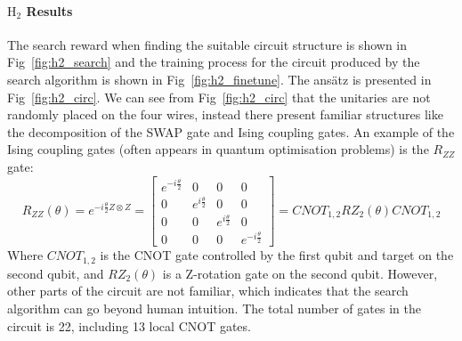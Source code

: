 \documentclass[a4paper,onecolumn,11pt]{quantumarticle}
\begin{document}
\paragraph{$\text{H}_2$ Results} The search reward when finding the suitable circuit structure is shown in Fig~\ref{fig:h2_search} and the training process for the circuit produced by the search algorithm is shown in Fig~\ref{fig:h2_finetune}. The ans\"atz is presented in Fig~\ref{fig:h2_circ}. We can see from Fig~\ref{fig:h2_circ} that the unitaries are not randomly placed on the four wires, instead there present familiar structures like the decomposition of the SWAP gate and Ising coupling gates. An example of the Ising coupling gates (often appears in quantum optimisation problems) is the $R_{ZZ}$ gate:
\begin{equation}
R_{Z Z}(\theta)=e^{ -i \frac{\theta}{2} Z \otimes Z}=\left[\begin{array}{cccc}
e^{-i \frac{\theta}{2}} & 0 & 0 & 0 \\
0 & e^{i \frac{\theta}{2}} & 0 & 0 \\
0 & 0 & e^{i \frac{\theta}{2}} & 0 \\
0 & 0 & 0 & e^{-i \frac{\theta}{2}}
\end{array}\right] = CNOT_{1,2}RZ_{2}(\theta)CNOT_{1,2}
\end{equation}
Where $CNOT_{1,2}$ is the CNOT gate controlled by the first qubit and target on the second qubit, and $RZ_{2}(\theta)$ is a Z-rotation gate on the second qubit.
However, other parts of the circuit are not familiar, which indicates that the search algorithm can go beyond human intuition. The total number of gates in the circuit is 22, including 13 local CNOT gates.
\end{document}

